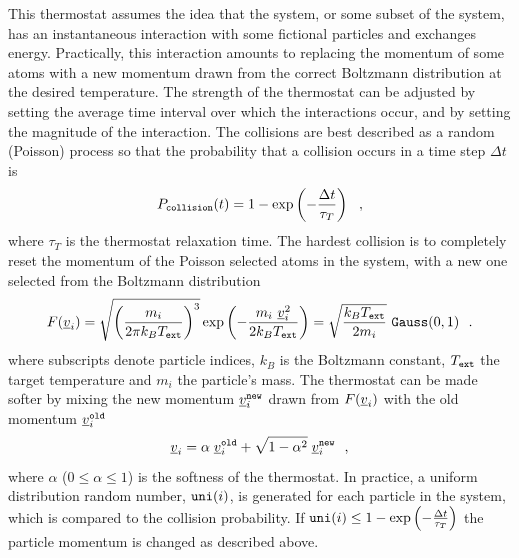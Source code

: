 This thermostat assumes the idea that the system, or some subset of
the system, has an instantaneous interaction with some fictional
particles and exchanges energy.  Practically, this interaction
amounts to replacing the momentum of some atoms with a new momentum
drawn from the correct Boltzmann distribution at the desired
temperature.  The strength of the thermostat can be adjusted by
setting the average time interval over which the interactions
occur, and by setting the magnitude of the interaction.  The
collisions are best described as a random (Poisson) process so that
the probability that a collision occurs
in a time step $\Delta t$ is
\begin{equation}
P_{\tt collision}(t) = 1 - \exp \left(-\frac{\Delta t}{\tau_{T}}\right)~~,
\end{equation}
where $\tau_{T}$ is the thermostat relaxation time.  The hardest
collision is to completely reset the momentum of the Poisson
selected atoms in the system, with a new one selected from the
Boltzmann distribution
\begin{equation}
F(\mbox{$\underline{v}$}_{i}) = \sqrt{\left(\frac{m_{i}}{2 \pi k_{B}T_{\tt ext}}\right)^{3}}
\exp \left(-\frac{m_{i}~\mbox{$\underline{v}$}_{i}^{2}}{2 k_{B}T_{\tt ext}}\right) =
\sqrt{\frac{k_{B}T_{\tt ext}}{2 m_{i}}}~{\tt Gauss}(0,1)~~.
\end{equation}
where subscripts denote particle indices, $k_{B}$ is the Boltzmann
constant, $T_{\tt ext}$ the target temperature and $m_{i}$ the particle's mass.
The thermostat can be made softer by mixing the new momentum
$\mbox{$\underline{v}$}_{i}^{\tt new}$ drawn from $F(\mbox{$\underline{v}$}_{i})$ with the old
momentum $\mbox{$\underline{v}$}_{i}^{\tt old}$
\begin{equation}
\mbox{$\underline{v}$}_{i} = \alpha \; \mbox{$\underline{v}$}_{i}^{\tt old} +
\sqrt{1-\alpha^{2}} \; \mbox{$\underline{v}$}_{i}^{\tt new}~~,
\end{equation}
where $\alpha$ ($0 \le \alpha \le 1$) is the softness of the
thermostat.  In practice, a uniform distribution random number,
${\tt uni}(i)$, is generated for each particle in the system,
which is compared to the collision probability.  If
${\tt uni}(i) \le 1 - \exp \left(-\frac{\Delta t}{\tau_{T}}\right)$
the particle momentum is changed as described above.

